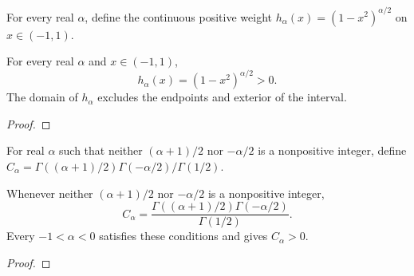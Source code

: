 \begin{supporting}
\begin{definition}
\label{def:power-law-schur-weight}
\leanok
For every real $\alpha$, define the continuous positive weight
$h_\alpha(x)=(1-x^2)^{\alpha/2}$ on $x\in(-1,1)$.
\end{definition}
\begin{theorem}
\label{thm:power-law-schur-weight}
\leanok
For every real $\alpha$ and $x\in(-1,1)$,
\[
 h_\alpha(x)=(1-x^2)^{\alpha/2}>0.
\]
The domain of $h_\alpha$ excludes the endpoints and exterior of the interval.
\end{theorem}
\begin{proof}
\leanok
\end{proof}

\begin{definition}
\label{def:power-law-schur-constant}
\leanok
For real $\alpha$ such that neither $(\alpha+1)/2$ nor $-\alpha/2$ is a
nonpositive integer, define
$C_\alpha=\Gamma((\alpha+1)/2)\Gamma(-\alpha/2)/\Gamma(1/2)$.
\end{definition}
\begin{theorem}
\label{thm:power-law-schur-constant}
\leanok
Whenever neither $(\alpha+1)/2$ nor $-\alpha/2$ is a nonpositive integer,
\[
 C_\alpha=\frac{\Gamma((\alpha+1)/2)\Gamma(-\alpha/2)}{\Gamma(1/2)}.
\]
Every $-1<\alpha<0$ satisfies these conditions and gives $C_\alpha>0$.
\end{theorem}
\begin{proof}
\leanok
\end{proof}


\end{supporting}
